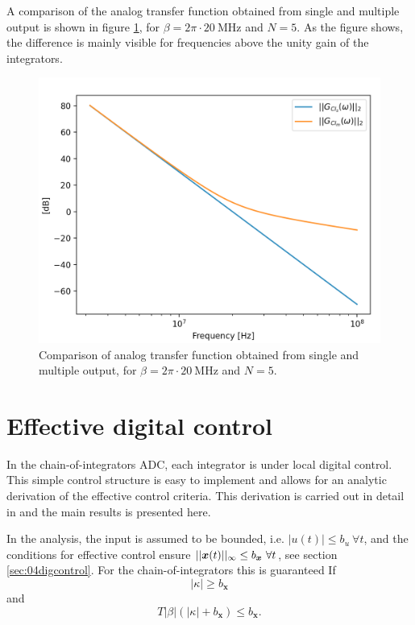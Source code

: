 A comparison of the analog transfer function obtained from single and multiple output is shown in figure \ref{fig:atf_ci_m_vs_s}, for $\beta = 2\pi \cdot \SI{20}{\mega\hertz}$ and $N=5$. As the figure shows, the difference is mainly visible for frequencies above the unity gain of the integrators.

\begin{figure}[htbp]
    \centering
    \includegraphics[width=\linewidth]{figures/051chain/ATF_m_vs_s.png}
    \caption{Comparison of analog transfer function obtained from single and multiple output, for $\beta = 2\pi \cdot \SI{20}{\mega\hertz}$ and $N=5$.}
    \label{fig:atf_ci_m_vs_s}
\end{figure}















\section{Effective digital control}
In the chain-of-integrators ADC, each integrator is under local digital control. This simple control structure is easy to implement and allows for an analytic derivation of the effective control criteria. This derivation is carried out in detail in \cite{malmberg_thesis} and the main results is presented here.

In the analysis, the input is assumed to be bounded, i.e. $|u(t)| \leq b_u \ \forall t$, and the conditions for effective control ensure $||\bm{x}(t)||_{\infty} \leq b_{\bm{x}} \ \forall t$, see section \ref{sec:04digcontrol}. For the chain-of-integrators this is guaranteed If
\begin{equation}
    \label{eq:effctrl_kappa}
    |\kappa| \geq b_{\bm{x}}
\end{equation}
and
\begin{equation}
    \label{eq:effctrl_Tbeta}
    T|\beta|(|\kappa| + b_{\bm{x}}) \leq b_{\bm{x}}.
\end{equation}

